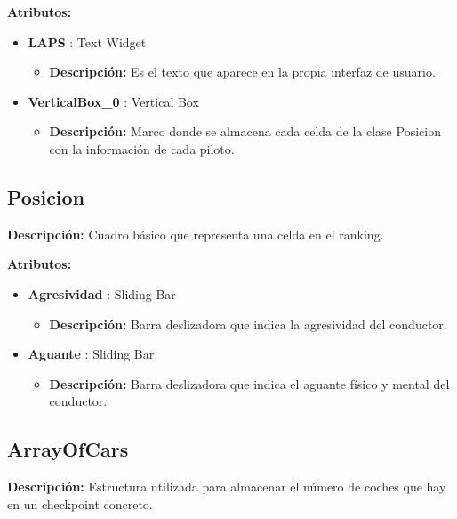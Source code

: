 \textbf{Atributos: }
\begin{itemize}
    \item \textbf{LAPS} : Text Widget
    \begin{itemize}
        \item \textbf{Descripción: }Es el texto que aparece en la propia interfaz de usuario.
    \end{itemize}

    \item \textbf{VerticalBox\_0} : Vertical Box
    \begin{itemize}
        \item \textbf{Descripción: }Marco donde se almacena cada celda de la clase Posicion con la información de cada piloto.
    \end{itemize}
\end{itemize}

\subsection{Posicion}
\textbf{Descripción: }Cuadro básico que representa una celda en el ranking.

\bigskip

\textbf{Atributos: }
\begin{itemize}
    \item \textbf{Agresividad} : Sliding Bar
    \begin{itemize}
        \item \textbf{Descripción: }Barra deslizadora que indica la agresividad del conductor.
    \end{itemize}

    \item \textbf{Aguante} : Sliding Bar
    \begin{itemize}
        \item \textbf{Descripción: }Barra deslizadora que indica el aguante físico y mental del conductor.
    \end{itemize}

\end{itemize}

\subsection{ArrayOfCars}
\textbf{Descripción: }Estructura utilizada para almacenar el número de coches que hay en un checkpoint concreto.

